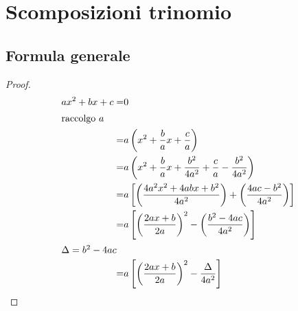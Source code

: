 \chapter{Scomposizioni trinomio}\label{ch:scomposizioni-trinomio}
\section{Formula generale}\label{sec:formula-generale}
\begin{proof}
	\begin{align*}
	ax^2+bx+c=&0\\
	\intertext{raccolgo $a$}
	=&a\left(x^2+\frac{b}{a}x+\frac{c}{a}\right)\\
	=&a\left(x^2+\frac{b}{a}x+\frac{b^2}{4a^2}+\frac{c}{a}-\frac{b^2}{4a^2}\right)\\
	=&a\left[\left(\frac{4a^2x^2+4abx+b^2}{4a^2}\right)+\left(\frac{4ac-b^2}{4a^2}\right)\right]\\
	=&a\left[\left(\frac{2ax+b}{2a}\right)^2-\left(\frac{b^2-4ac}{4a^2}\right)\right]\\
	\intertext{$\Delta=b^2-4ac$}
	=&a\left[\left(\frac{2ax+b}{2a}\right)^2-\frac{\Delta}{4a^2}\right]
	\end{align*}
\end{proof}
